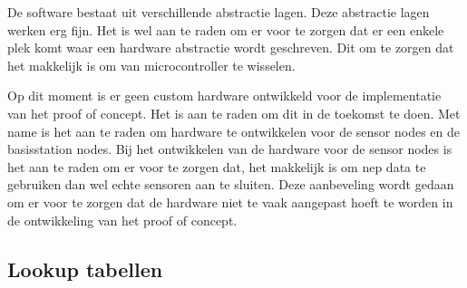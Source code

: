 De software bestaat uit verschillende abstractie lagen. Deze abstractie lagen werken erg fijn. Het is wel aan te raden om er voor te zorgen dat er een enkele plek komt waar een hardware abstractie wordt geschreven. Dit om te zorgen dat het makkelijk is om van microcontroller te wisselen.

Op dit moment is er geen custom hardware ontwikkeld voor de implementatie van het proof of concept. Het is aan te raden om dit in de toekomst te doen. Met name is het aan te raden om hardware te ontwikkelen voor de sensor nodes en de basisstation nodes. Bij het ontwikkelen van de hardware voor de sensor nodes is het aan te raden om er voor te zorgen dat, het makkelijk is om nep data te gebruiken dan wel echte sensoren aan te sluiten. Deze aanbeveling wordt gedaan om er voor te zorgen dat de hardware niet te vaak aangepast hoeft te worden in de ontwikkeling van het proof of concept.


\subsection{Lookup tabellen}

